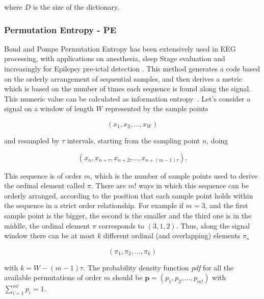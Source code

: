 \noindent where $D$ is the size of the dictionary.  



\subsubsection{Permutation Entropy - PE}

Bond and Pompe Permutation Entropy has been extensively used in EEG processing, with applications on anesthesia, sleep Stage evaluation and increasingly for Epilepsy pre-ictal detection \cite{Bandt2002}.  This method generates a code based on the orderly arrangement of sequential samples, and then derives a metric which is based on the number of times each sequence is found along the signal.  This numeric value can be calculated as information entropy~\cite{Nicolaou2010}. Let's consider a signal on a window of length $W$ represented by the sample points

\begin{equation}
(x_1,x_2,...,x_{W})
\label{eq:pesignal}
\end{equation}

\noindent and resampled by $\tau$ intervals, starting from the sampling point $n$, doing

\begin{equation}
(x_n,x_{n+\tau},x_{n+2 \tau}...,x_{n+(m-1)\tau}).
\label{eq:pe2}
\end{equation}

This sequence is of order $m$, which is the number of sample points used to derive the ordinal element called $\pi$. There are $m!$ ways in which this sequence can be orderly arranged, according to the position that each sample point holds within the sequence in a strict order relationship.  For example if $m=3$, and the first sample point is the bigger, the second is the smaller and the third one is in the middle, the ordinal element $\pi$ corresponds to $(3,1,2)$. Thus, along the signal window there can be at most $k$ different ordinal (and overlapping) elements $\pi_{s}$

\begin{equation}
(\pi_{1},\pi_{2},...,\pi_{k})
\label{eq:pe3}
\end{equation}

\noindent with $k = W-(m-1) \tau$.  The probability density function \textit{pdf} for all the available permutations of order $m$ should be $ \textbf{p} = (p_1,p_2,...,p_{m!}) $ with $ \sum_{i=1}^{m!} p_{i} = 1 $.

